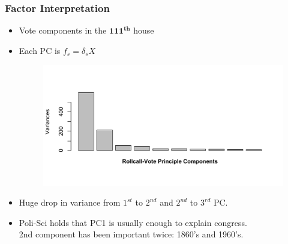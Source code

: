 \documentclass[
  shownotes,
  xcolor={svgnames},
  hyperref={colorlinks,citecolor=DarkBlue,linkcolor=DarkRed,urlcolor=DarkBlue}
  , aspectratio=169]{beamer}
\newcommand{\sg}{\color{DarkSlateGray}}
\newcommand{\bs}[1]{\boldsymbol{#1}}
\begin{document}
\begin{frame}[fragile]
\frametitle{Factor Interpretation}

\begin{itemize}

  \item Vote components in the $\bs{111^{th}}$ house
 
 \item Each PC is $f_s = \delta_s X$ 

  \begin{figure}[H] \centering
            \captionsetup{justification=centering}
              \includegraphics[scale=0.5]{../Lecture26/figures/VOTEscree}
              
 \end{figure}

\item Huge drop in variance from $1^{st}$ to $2^{nd}$ and  $2^{nd}$ to $3^{rd}$ PC.
\item Poli-Sci holds that PC1 is usually enough to explain congress. \\\sg 2nd component has been important twice: 1860's and 1960's.

\end{itemize}


\end{frame}
\end{document}
